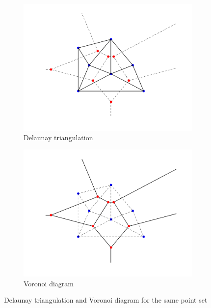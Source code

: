 \begin{figure}[ht]
    \centering
    \begin{subfigure}[b]{0.4\textwidth}
        \centering
        \includegraphics[width=\textwidth]{report/Images/Theory/voronoi/voronoi_duality_delaunay.png}
        \caption{Delaunay triangulation}
        \label{fig:ex:voronoi-delaunay}
    \end{subfigure}
    \begin{subfigure}[b]{0.4\textwidth}
        \centering
        \includegraphics[width=\textwidth]{report/Images/Theory/voronoi/voronoi_duality_voronoi.png}
        \caption{Voronoi diagram}
        \label{fig:ex:voronoi-voronoi}
    \end{subfigure}
    \caption[Duality of Delaunay triangulations and Voronoi diagrams]{Delaunay triangulation and Voronoi diagram for the same point set}
    \label{fig:ex:voronoi}
\end{figure}


